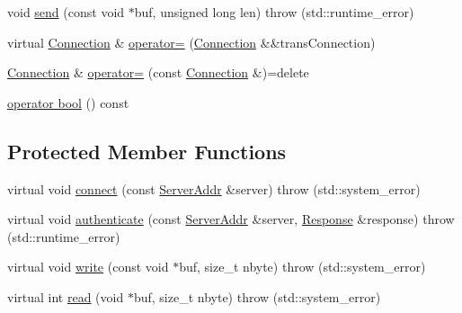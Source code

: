 \begin{DoxyCompactItemize}
\item 
void \hyperlink{class_nntp_client_1_1_connection_ad2338e224cb16800508151cbcbf3f77c}{send} (const void $\ast$buf, unsigned long len)  throw (std\+::runtime\+\_\+error)
\item 
virtual \hyperlink{class_nntp_client_1_1_connection}{Connection} \& \hyperlink{class_nntp_client_1_1_connection_af23500ee46f48a9ae8b724d4169ea853}{operator=} (\hyperlink{class_nntp_client_1_1_connection}{Connection} \&\&trans\+Connection)
\item 
\hyperlink{class_nntp_client_1_1_connection}{Connection} \& \hyperlink{class_nntp_client_1_1_connection_af71eb88c036281c8e6e712831c1f94f8}{operator=} (const \hyperlink{class_nntp_client_1_1_connection}{Connection} \&)=delete
\item 
\hyperlink{class_nntp_client_1_1_connection_aae3445a5eb5c440a425d1e342fd4f0d8}{operator bool} () const
\end{DoxyCompactItemize}
\subsection*{Protected Member Functions}
\begin{DoxyCompactItemize}
\item 
virtual void \hyperlink{class_nntp_client_1_1_connection_afd86e34fcca569da32627d2b458caebf}{connect} (const \hyperlink{class_nntp_client_1_1_server_addr}{Server\+Addr} \&server)  throw (std\+::system\+\_\+error)
\item 
virtual void \hyperlink{class_nntp_client_1_1_connection_a877aa852a68915e0ecf82cd147c0b451}{authenticate} (const \hyperlink{class_nntp_client_1_1_server_addr}{Server\+Addr} \&server, \hyperlink{class_nntp_client_1_1_response}{Response} \&response)  throw (std\+::runtime\+\_\+error)
\item 
virtual void \hyperlink{class_nntp_client_1_1_connection_aed3a92b2dd40fa1855c2d71df424f217}{write} (const void $\ast$buf, size\+\_\+t nbyte)  throw (std\+::system\+\_\+error)
\item 
virtual int \hyperlink{class_nntp_client_1_1_connection_aed3df70a3839498d0fd3080be9be35d6}{read} (void $\ast$buf, size\+\_\+t nbyte)  throw (std\+::system\+\_\+error)
\end{DoxyCompactItemize}
